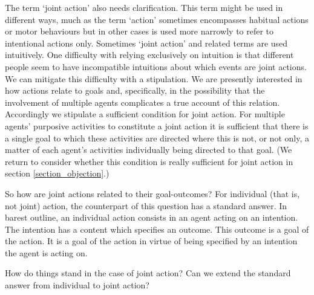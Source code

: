 \documentclass[12pt,a4paper]{extarticle}
\begin{document}
The term `joint action' also needs clarification.  This term might be used in different ways, much as the term `action' sometimes encompasses habitual actions or motor behaviours but in other cases is used more narrowly to refer to intentional actions only.  
Sometimes `joint action' and related terms are used intuitively.
One difficulty with relying exclusively on intuition is that different people seem to have incompatible intuitions about which events are joint actions.
We can mitigate this difficulty with a stipulation.
We are presently interested in how actions relate to goals and, specifically, in the possibility that the involvement of multiple agents complicates a true account of this relation.  Accordingly we stipulate a sufficient condition for joint action.  For multiple agents' purposive activities to constitute a joint action it is sufficient that there is a single goal to which these activities are directed where this is not, or not only, a matter of each agent's activities individually being directed to that goal.   
(We return to consider whether this condition is really sufficient for joint action in section \vref{section_objection}.)

So how are joint actions related to their goal-outcomes?  For individual (that is, not joint) action, the counterpart of this question has a standard answer.  In barest outline, an individual action consists in an agent acting on an intention.  The intention has a content which specifies an outcome.
This outcome is a goal of the action.
It is a goal of the action in virtue of being specified by an intention the agent is acting on. 


How do things stand in the case of joint action?  Can we extend the standard answer from individual to joint action?  
\end{document}
